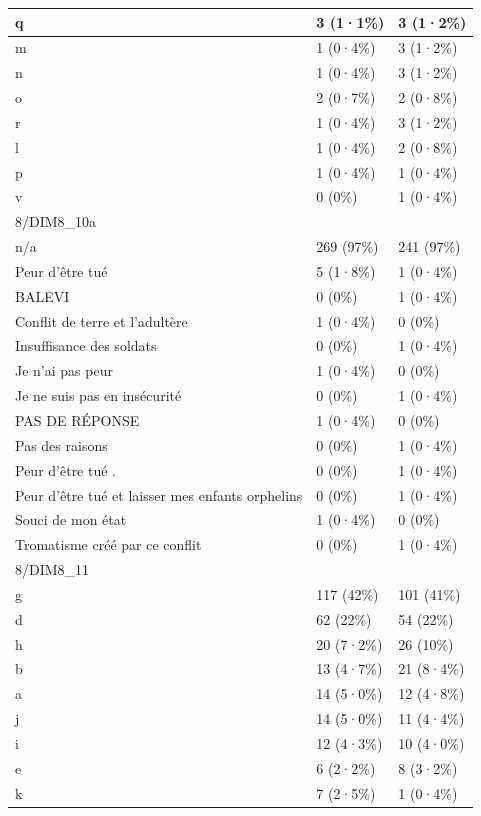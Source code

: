 \documentclass[
]{book}
\begin{document}
\begin{tabular}{l|l|l}
\hline
q & 3 (1·1\%) & 3 (1·2\%)\\
\hline
m & 1 (0·4\%) & 3 (1·2\%)\\
\hline
n & 1 (0·4\%) & 3 (1·2\%)\\
\hline
o & 2 (0·7\%) & 2 (0·8\%)\\
\hline
r & 1 (0·4\%) & 3 (1·2\%)\\
\hline
l & 1 (0·4\%) & 2 (0·8\%)\\
\hline
p & 1 (0·4\%) & 1 (0·4\%)\\
\hline
v & 0 (0\%) & 1 (0·4\%)\\
\hline
8/DIM8\_10a &  & \\
\hline
n/a & 269 (97\%) & 241 (97\%)\\
\hline
Peur d'être tué & 5 (1·8\%) & 1 (0·4\%)\\
\hline
BALEVI & 0 (0\%) & 1 (0·4\%)\\
\hline
Conflit de terre et l'adultère & 1 (0·4\%) & 0 (0\%)\\
\hline
Insuffisance des soldats & 0 (0\%) & 1 (0·4\%)\\
\hline
Je n'ai pas peur & 1 (0·4\%) & 0 (0\%)\\
\hline
Je ne suis pas en insécurité & 0 (0\%) & 1 (0·4\%)\\
\hline
PAS DE RÉPONSE & 1 (0·4\%) & 0 (0\%)\\
\hline
Pas des raisons & 0 (0\%) & 1 (0·4\%)\\
\hline
Peur d'être tué . & 0 (0\%) & 1 (0·4\%)\\
\hline
Peur d'être tué et laisser mes enfants orphelins & 0 (0\%) & 1 (0·4\%)\\
\hline
Souci de mon état & 1 (0·4\%) & 0 (0\%)\\
\hline
Tromatisme créé par ce conflit & 0 (0\%) & 1 (0·4\%)\\
\hline
8/DIM8\_11 &  & \\
\hline
g & 117 (42\%) & 101 (41\%)\\
\hline
d & 62 (22\%) & 54 (22\%)\\
\hline
h & 20 (7·2\%) & 26 (10\%)\\
\hline
b & 13 (4·7\%) & 21 (8·4\%)\\
\hline
a & 14 (5·0\%) & 12 (4·8\%)\\
\hline
j & 14 (5·0\%) & 11 (4·4\%)\\
\hline
i & 12 (4·3\%) & 10 (4·0\%)\\
\hline
e & 6 (2·2\%) & 8 (3·2\%)\\
\hline
k & 7 (2·5\%) & 1 (0·4\%)\\

\end{tabular}
\end{document}
